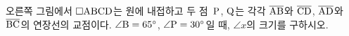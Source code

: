 \noindent\begin{minipage}[t]{0.58\linewidth}\vspace{0pt}\raggedright 오른쪽 그림에서 $\square\mathrm{ABCD}$는 원에 내접하고 두 점~$\mathrm{P}$, $\mathrm{Q}$는 각각 $\overline{\mathrm{AB}}$와 $\overline{\mathrm{CD}}$, $\overline{\mathrm{AD}}$와 $\overline{\mathrm{BC}}$의 연장선의 교점이다. $\angle\mathrm{B}=65^\circ$, $\angle\mathrm{P}=30^\circ$일 때, $\angle x$의 크기를 구하시오.\end{minipage}\hfill\begin{minipage}[t]{0.4\linewidth}\vspace{0pt}\centering \resizebox{\ifdim\width>\linewidth\linewidth\else\width\fi}{!}{}\end{minipage}\par
